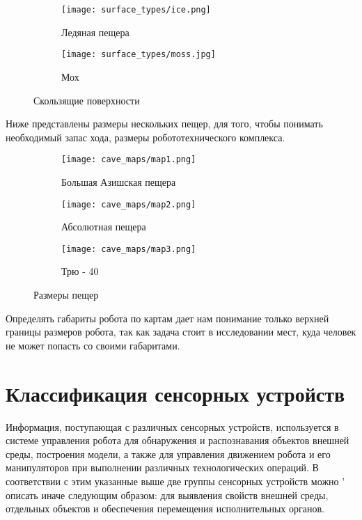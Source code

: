 \begin{figure}[H]
\begin{subfigure}{0.49\textwidth}
\centering\texttt{[image: surface\_types/ice.png]}\\
\caption{Ледяная пещера}
\label{fig:icee}
\end{subfigure}
\begin{subfigure}{0.49\textwidth}
\centering\texttt{[image: surface\_types/moss.jpg]}\\
\caption{Мох}
\label{fig:moss}
\end{subfigure}
\caption{Скользящие поверхности}
\label{fig:slippery_surfaces}
\end{figure}

Ниже представлены размеры нескольких пещер, для того, чтобы понимать необходимый запас хода, размеры робототехнического комплекса.

\begin{figure}[H]
\begin{subfigure}{0.8\textwidth}
\centering\texttt{[image: cave\_maps/map1.png]}\\
\caption{Большая Азишская пещера}
\label{fig:ice}
\end{subfigure}
\begin{subfigure}{0.8\textwidth}
\centering\texttt{[image: cave\_maps/map2.png]}\\
\caption{Абсолютная пещера}
\end{subfigure}
\begin{subfigure}{0.8\textwidth}
\centering\texttt{[image: cave\_maps/map3.png]}\\
\caption{Трю - 40}
\end{subfigure}
\caption{Размеры пещер}
\end{figure}

Определять габариты робота по картам дает нам понимание только верхней границы размеров робота, так как задача стоит в исследовании мест, куда человек не может попасть со своими габаритами.



\section{Классификация сенсорных устройств}
Информация, поступающая с различных сенсорных устройств, используется в системе управления робота для обнаружения и распознавания объектов внешней среды, построения модели, а также для управления движением робота и его манипуляторов при выполнении различных технологических операций. В соответствии с этим указанные выше две группы сенсорных устройств можно ' описать иначе следующим образом: для выявления свойств внешней среды, отдельных объектов и обеспечения перемещения исполнительных органов.

